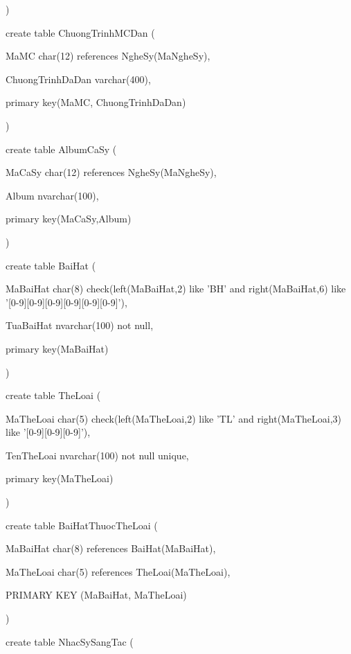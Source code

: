 \documentclass{report}
\begin{document}
	\setlength{\parindent}{0.5cm}
)

\bigskip

create table ChuongTrinhMCDan (

	\setlength{\parindent}{1.5cm}
	MaMC char(12) references NgheSy(MaNgheSy),
	
	ChuongTrinhDaDan varchar(400),
	
	primary key(MaMC, ChuongTrinhDaDan)
	
	\setlength{\parindent}{0.5cm}
)

\bigskip

create table AlbumCaSy (

	\setlength{\parindent}{1.5cm}
	MaCaSy char(12) references NgheSy(MaNgheSy),
	
	Album nvarchar(100),
	
	primary key(MaCaSy,Album)
	
	\setlength{\parindent}{0.5cm}
)

\bigskip

create table BaiHat (

	\setlength{\parindent}{1.5cm}
	MaBaiHat char(8) check(left(MaBaiHat,2) like 'BH' and right(MaBaiHat,6) like '[0-9][0-9][0-9][0-9][0-9][0-9]'),
	
	TuaBaiHat nvarchar(100) not null,
	
	primary key(MaBaiHat)
	
	\setlength{\parindent}{0.5cm}
)

\bigskip

create table TheLoai (

	\setlength{\parindent}{1.5cm}
	MaTheLoai char(5) check(left(MaTheLoai,2) like 'TL' and right(MaTheLoai,3) like '[0-9][0-9][0-9]'),
	
	TenTheLoai nvarchar(100) not null unique,
	
	primary key(MaTheLoai)
	
	\setlength{\parindent}{0.5cm}
)

\bigskip

create table BaiHatThuocTheLoai (

	\setlength{\parindent}{1.5cm}
	MaBaiHat char(8) references BaiHat(MaBaiHat),
	
	MaTheLoai char(5) references TheLoai(MaTheLoai),
	
	PRIMARY KEY (MaBaiHat, MaTheLoai)
	
	\setlength{\parindent}{0.5cm}
)

\bigskip

create table NhacSySangTac (
\end{document}
